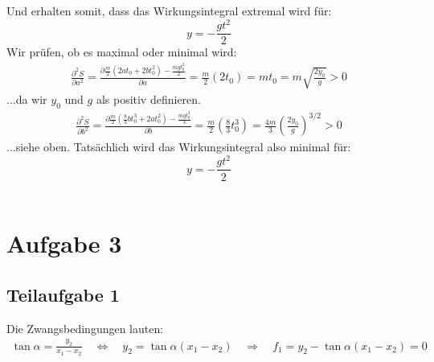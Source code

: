 \documentclass[a4paper,german,12pt,smallheadings]{scrartcl}
\begin{document}
Und erhalten somit, dass das Wirkungsintegral extremal wird für:
\begin{equation}
y=-\frac{gt^2}{2}
\end{equation}
Wir prüfen, ob es maximal oder minimal wird:
\begin{align*}
\frac{\partial^2 S}{\partial a^2}=\frac{\partial \frac{m}{2}\left(2at_0+2bt_0^2\right)-\frac{mgt_0^2}{2}}{\partial a}=\frac{m}{2}\left(2t_0\right)=mt_0=m \sqrt{\frac{2y_0}{g}}>0
\end{align*}
...da wir $y_0$ und $g$ als positiv definieren.
\begin{align*}
\frac{\partial^2 S}{\partial b^2}=\frac{\partial \frac{m}{2}\left(\frac{8}{3}bt_0^3+2at_0^2\right)-\frac{mgt_0^3}{3}}{\partial b}=\frac{m}{2}\left(\frac{8}{3}t_0^3\right)=\frac{4m}{3} \left(\frac{2y_0}{g}\right)^{3/2}>0
\end{align*}
...siehe oben. Tatsächlich wird das Wirkungsintegral also minimal für:
\begin{equation}
y=-\frac{gt^2}{2}
\end{equation}
\\
\section*{Aufgabe 3}
\subsection*{Teilaufgabe 1}
Die Zwangsbedingungen lauten:
\begin{align}
\tan\alpha=\frac{y_2}{x_1-x_2} \quad \Leftrightarrow \quad y_2=\tan\alpha \left(x_1-x_2\right) \quad \Rightarrow \quad f_1=y_2-\tan\alpha \left(x_1-x_2\right)=0
\end{align}
\end{document}
